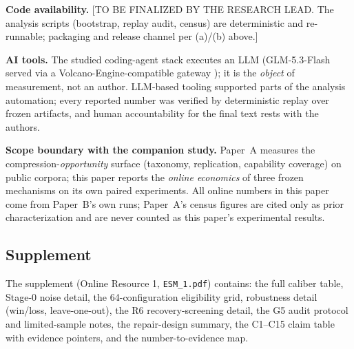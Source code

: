 \documentclass[twocolumn]{svjour3}       %
\begin{document}
\textbf{Code availability.} [TO BE FINALIZED BY THE RESEARCH LEAD. The analysis scripts
(bootstrap, replay audit, census) are deterministic and re-runnable; packaging and
release channel per (a)/(b) above.]

\textbf{AI tools.} The studied coding-agent stack executes an LLM (GLM-5.3-Flash served
via a Volcano-Engine-compatible gateway \cite{opencode2026}); it is the \emph{object} of
measurement, not an author. LLM-based tooling supported parts of the analysis
automation; every reported number was verified by deterministic replay over frozen
artifacts, and human accountability for the final text rests with the authors.

\textbf{Scope boundary with the companion study.} Paper~A \cite{paperA2026} measures the
compression-\emph{opportunity} surface (taxonomy, replication, capability coverage) on
public corpora; this paper reports the \emph{online economics} of three frozen
mechanisms on its own paired experiments. All online numbers in this paper come from
Paper~B's own runs; Paper~A's census figures are cited only as prior characterization
and are never counted as this paper's experimental results.

\begin{appendix}
\section{Supplement}
The supplement (Online Resource 1, \texttt{ESM\_1.pdf}) contains: the full caliber
table, Stage-0 noise detail, the 64-configuration eligibility grid, robustness
detail (win/loss, leave-one-out), the R6 recovery-screening detail, the G5 audit
protocol and limited-sample notes, the repair-design summary, the C1--C15 claim table
with evidence pointers, and the number-to-evidence map.
\end{appendix}

\balance


\end{document}

